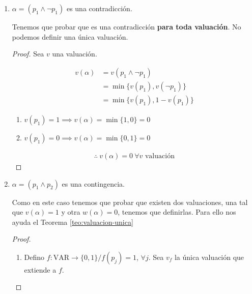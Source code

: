 \begin{enumerate}
    \item $\alpha = (p_1 \wedge \neg p_1)$ es una contradicción.

        Tenemos que probar que es una contradicción 
        \textbf{para toda valuación}. No podemos definir una única valuación.

        \begin{proof} \phantom{.}
        
            Sea $v$ una valuación.

            \begin{align*}
                v(\alpha) &= v(p_1 \wedge \neg p_1) \\
                &= \min \{ v(p_1), v(\neg p_1) \} \\
                &= \min \{ v(p_1), 1-v(p_1) \}
            \end{align*}

            \begin{enumerate}[%
                labelindent=*,
                style=multiline,
                leftmargin=*,
                align=left,
                leftmargin=2\parindent,
                label=Caso \arabic*)]
                \item $v(p_1) = 1 \implies v(\alpha) = \min \{ 1,0 \} = 0$
                \item $v(p_1) = 0 \implies v(\alpha)=\min \{ 0,1 \} = 0$
            \end{enumerate}
            \begin{gather*}
                \therefore ~ v(\alpha) = 0 ~ \forall v \text{ valuación}
            \end{gather*}
            
        \end{proof}
        
    \item $\alpha = (p_1 \wedge p_2)$ es una contingencia.

        Como en este caso tenemos que probar que existen dos valuaciones,
        una tal que $v(\alpha)=1$ y otra $w(\alpha)=0$, tenemos que 
        definirlas. Para ello nos ayuda el Teorema \ref{teo:valuacion-unica}


        \begin{proof} \phantom{.}
        
            \begin{enumerate}
                \item Defino $f: \mathrm{VAR} \to \{ 0,1 \}/ f(p_j) = 1$, $\forall j$.
            Sea $v_f$ la única valuación que extiende a $f$.


\end{enumerate}
\end{proof}
\end{enumerate}
